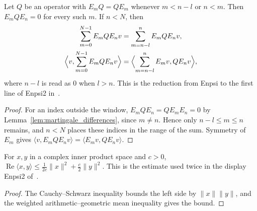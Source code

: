 \begin{lemma}
    \label{lem:martingale_outside_window}
    \leanok
    Let $Q$ be an operator with $E_mQ=QE_m$ whenever $m<n-l$ or $n<m$. Then
    $E_mQE_n=0$ for every such $m$. If $n<N$, then
    \begin{align}
        \sum_{m=0}^{N-1}E_mQE_nv & =\sum_{m=n-l}^{n}E_mQE_nv,
        \notag                                                                          \\
        \Bigl\langle v,\sum_{m=0}^{N-1}E_mQE_nv\Bigr\rangle
                                 & =\Bigl\langle\sum_{m=n-l}^{n}E_mv,QE_nv\Bigr\rangle,
        \label{eq:martingale_outside_window}
    \end{align}
    where $n-l$ is read as $0$ when $l>n$. This is the reduction from \textup{Enpsi} to
    the first line of \textup{Enpsi2} in~\cite[lines
        1206--1220]{Nachtergaele1996Spectral}.
\end{lemma}
\begin{proof}\leanok
    For an index outside the window, $E_mQE_n=QE_mE_n=0$ by
    Lemma~\ref{lem:martingale_differences}, since $m\neq n$. Hence only
    $n-l\le m\le n$ remains, and $n<N$ places these indices in the range of the sum.
    Symmetry of $E_m$ gives $\langle v,E_mQE_nv\rangle=\langle E_mv,QE_nv\rangle$.
\end{proof}

\begin{lemma}
    \label{lem:martingale_weighted_inner}
    \leanok
    For $x,y$ in a complex inner product space and $c>0$,
    $\operatorname{Re}\langle x,y\rangle\le\frac1{2c}\lVert x\rVert^2+\frac c2\lVert y\rVert^2$.
    This is the estimate used twice in the display \textup{Enpsi2}
    of~\cite[lines 1223--1239]{Nachtergaele1996Spectral}.
\end{lemma}
\begin{proof}\leanok
    The Cauchy--Schwarz inequality bounds the left side by
    $\lVert x\rVert\lVert y\rVert$, and the weighted arithmetic--geometric mean
    inequality gives the bound.
\end{proof}

